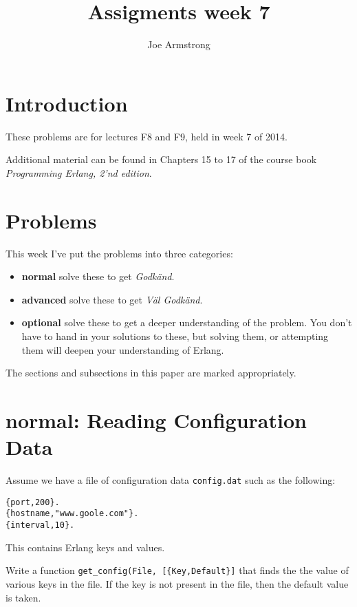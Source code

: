 \documentclass[12pt]{hitec}
\title{Assigments week 7}
\author{Joe Armstrong}
\begin{document}
\maketitle

\tableofcontents

\section{Introduction}
These problems are for lectures F8 and F9, held in week 7 of 2014.

Additional material can be found in Chapters 15 to 17 of the course book
{\sl Programming Erlang, 2'nd edition}.

\section{Problems}

This week I've put the problems into three categories:

\begin{itemize}
\item {\bf normal} solve these to get {\sl Godk\"{a}nd}.
\item {\bf advanced} solve these to get {\sl V\"{a}l Godk\"{a}nd}.
\item {\bf optional} solve these to get a deeper understanding of the problem. You don't
have to hand in your solutions to these, but solving them, or attempting them will
deepen your understanding of Erlang.
\end{itemize}

The sections and subsections in this paper are marked appropriately.

\section{normal: Reading Configuration Data}

Assume we have a file of configuration data \verb+config.dat+ such as the following:

\begin{Verbatim}[frame=single]
{port,200}.
{hostname,"www.goole.com"}.
{interval,10}.
\end{Verbatim}

This contains Erlang keys and values.

Write a function \verb+get_config(File, [{Key,Default}]+ that finds the
the value of various keys in the file. If the key is not present in the file,
then the default value is taken.
\end{document}
